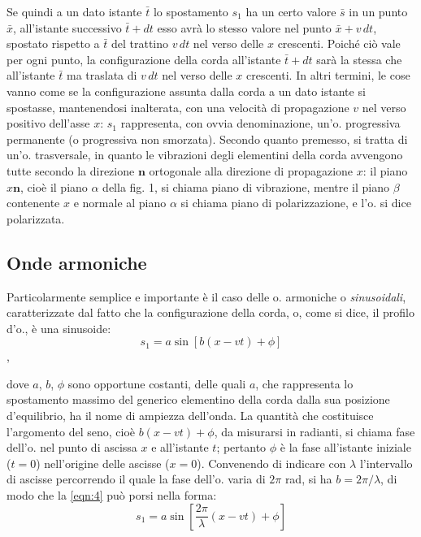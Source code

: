 \documentclass[a4paper]{article}
\begin{document}
Se quindi a un dato istante $\bar{t}$ lo spostamento $s_1$ ha un certo valore $\bar{s}$ in un punto $\bar{x}$, all'istante successivo $\bar{t}+dt$ esso avrà lo stesso valore nel punto $\bar{x}+v\,dt$, spostato rispetto a $\bar{t}$ del trattino $v\,dt$ nel verso delle $x$ crescenti. Poiché ciò vale per ogni punto, la configurazione della corda all'istante $\bar{t}+dt$ sarà la stessa che all'istante $\bar{t}$ ma traslata di $v\,dt$ nel verso delle $x$ crescenti. In altri termini, le cose vanno come se la configurazione assunta dalla corda a un dato istante si spostasse, mantenendosi inalterata, con una velocità di propagazione $v$ nel verso positivo dell'asse $x$: $s_1$ rappresenta, con ovvia denominazione, un'o. progressiva permanente (o progressiva non smorzata). Secondo quanto premesso, si tratta di un'o. trasversale, in quanto le vibrazioni degli elementini della corda avvengono tutte secondo la direzione $\mathbf{n}$ ortogonale alla direzione di propagazione $x$: il piano $x\mathbf{n}$, cioè il piano $\alpha$ della fig. 1, si chiama piano di vibrazione, mentre il piano $\beta$ contenente $x$ e normale al piano $\alpha$ si chiama piano di polarizzazione, e l'o. si dice polarizzata. 

\subsection{Onde armoniche}
Particolarmente semplice e importante è il caso delle o. armoniche o \textit{sinusoidali}, caratterizzate dal fatto che la configurazione della corda, o, come si dice, il profilo d'o., è una sinusoide: 
\begin{equation}
\label{eqn:4}
s_1=a\sin [b(x-vt)+\phi]
\end{equation},

dove $a$, $b$, $\phi$ sono opportune costanti, delle quali $a$, che rappresenta lo spostamento massimo del generico elementino della corda dalla sua posizione d'equilibrio, ha il nome di ampiezza dell'onda. La quantità che costituisce l'argomento del seno, cioè $b(x-vt)+\phi$, da misurarsi in radianti, si chiama fase dell'o. nel punto di ascissa $x$ e all'istante $t$; pertanto $\phi$ è la fase all'istante iniziale ($t=0$) nell'origine delle ascisse ($x=0$). Convenendo di indicare con $\lambda$ l'intervallo di ascisse percorrendo il quale la fase dell'o. varia di $2\pi$ rad, si ha $b={2\pi}/\lambda$, di modo che la \eqref{eqn:4} può porsi nella forma: 
\begin{equation}
\label{eqn:5}
s_1=a\sin [\frac{2\pi}{\lambda}(x-vt)+\phi]
\end{equation}
\end{document}
